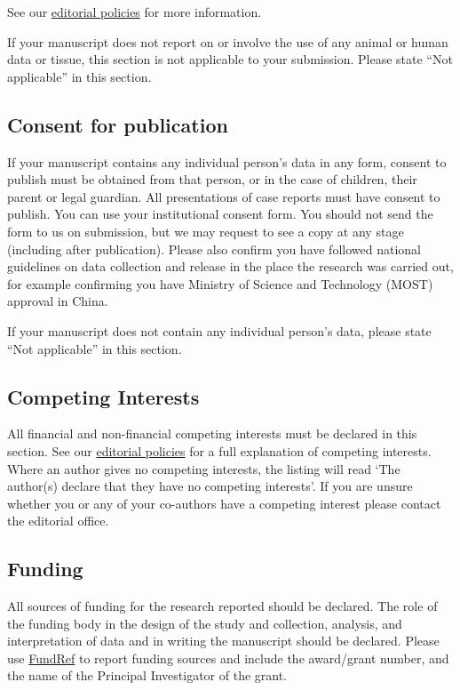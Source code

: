 \documentclass[a4paper,num-refs]{oup-contemporary}
\begin{document}
See our \href{https://academic.oup.com/gigascience/pages/editorial_policies_and_reporting_standards}{editorial policies} for more information.

If your manuscript does not report on or involve the use of any animal or human data or tissue, this section is not applicable to your submission. Please state ``Not applicable'' in this section.

\subsection{Consent for publication}

If your manuscript contains any individual person's data in any form, consent to publish must be obtained from that person, or in the case of children, their parent or legal guardian. All presentations of case reports must have consent to publish. You can use your institutional consent form. You should not send the form to us on submission, but we may request to see a copy at any stage (including after publication). Please also confirm you have followed national guidelines on data collection and release in the place the research was carried out, for example confirming you have Ministry of Science and Technology (MOST) approval in China.

If your manuscript does not contain any individual person's data, please state ``Not applicable'' in this section.

\subsection{Competing Interests}

All financial and non-financial competing interests must be declared in this section. See our \href{https://academic.oup.com/gigascience/pages/editorial_policies_and_reporting_standards}{editorial policies} for a full explanation of competing interests. Where an author gives no competing interests, the listing will read `The author(s) declare that they have no competing interests'. If you are unsure whether you or any of your co-authors have a competing interest please contact the editorial office.


\subsection{Funding}

All sources of funding for the research reported should be declared. The role of the funding body in the design of the study and collection, analysis, and interpretation of data and in writing the manuscript should be declared. Please use \href{http://www.crossref.org/fundingdata/}{FundRef} to report funding sources and include the award/grant number, and the name of the Principal Investigator of the grant. 
\end{document}
